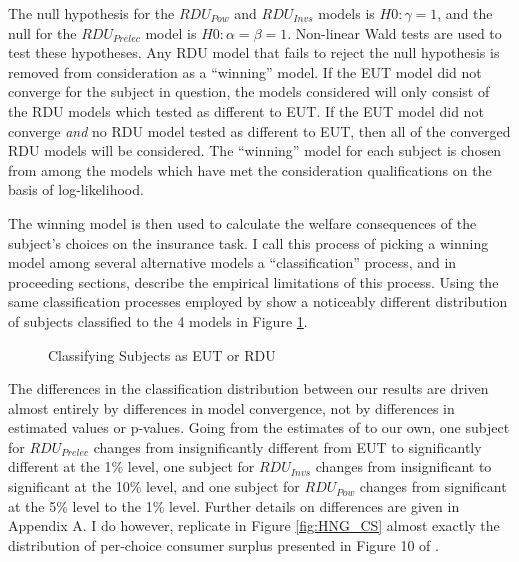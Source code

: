 \documentclass[../main.tex]{subfiles}
\begin{document}
The null hypothesis for the $\mathit{RDU_{Pow}}$ and $\mathit{RDU_{Invs}}$ models is $H0: \gamma = 1$, and the null for the $\mathit{RDU_{Prelec}}$ model is $H0: \alpha = \beta = 1$.
Non-linear Wald tests are used to test these hypotheses.
Any RDU model that fails to reject the null hypothesis is removed from consideration as a \enquote{winning} model.
If the EUT model did not converge for the subject in question, the models considered will only consist of the RDU models which tested as different to EUT.
If the EUT model did not converge \textit{and} no RDU model tested as different to EUT, then all of the converged RDU models will be considered.
The \enquote{winning} model for each subject is chosen from among the models which have met the consideration qualifications on the basis of log-likelihood.

The winning model is then used to calculate the welfare consequences of the subject's choices on the insurance task.
I call this process of picking a winning model among several alternative models a \enquote{classification} process, and in proceeding sections, describe the empirical limitations of this process.
Using the same classification processes employed by \textcite{Harrison2016} show a noticeably different distribution of subjects classified to the 4 models in Figure \ref{fig:HNG_pvals}.

\begin{figure}[h!]
	\center
	\caption{Classifying Subjects as EUT or RDU}
	\label{fig:HNG_pvals}
\end{figure}

The differences in the classification distribution between our results are driven almost entirely by differences in model convergence, not by differences in estimated values or p-values.
Going from the estimates of \textcite{Harrison2016} to our own, one subject for $\mathit{RDU_{Prelec}}$ changes from insignificantly different from EUT to significantly different at the 1\% level, one subject for $\mathit{RDU_{Invs}}$ changes from insignificant to significant at the 10\% level, and one subject for $\mathit{RDU_{Pow}}$ changes from significant at the 5\% level to the 1\% level.
Further details on differences are given in Appendix A.
I do however, replicate in Figure \ref{fig:HNG_CS} almost exactly the distribution of per-choice consumer surplus presented in Figure 10 of \textcite[108]{Harrison2016}.
\end{document}

